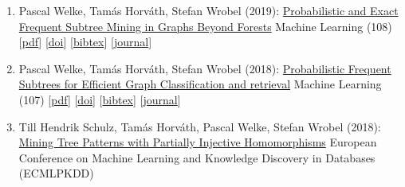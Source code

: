 \documentclass{scrartcl}
\begin{document}
\begin{enumerate}
\label{mehler2020frontiers}
Alexander Mehler, Wahed Hemati, Pascal Welke, Maxim Konca, Tolga Uslu (2020):\newline
\href{https://dx.doi.org/10.3389/feduc.2020.562670}{Multiple Texts as a Limiting Factor in Online Learning: Quantifying
(Dis-)similarities of Knowledge Networks across Languages}\newline
Frontiers in Education | Digital Education\newline
{\footnotesize
[\href{https://pwelke.github.io/publications/mehler2020frontiers.pdf}{pdf}]
[\href{https://dx.doi.org/10.3389/feduc.2020.562670}{doi}]
[\href{https://arxiv.org/abs/2008.02047}{arxiv}]
[\href{https://dblp.org/rec/journals/corr/abs-2008-02047.bib}{bibtex}]
[\href{https://www.frontiersin.org/journals/education/sections/digital-education#}{journal}]
}
\item
\label{welke2019mach}
Pascal Welke, Tamás Horváth, Stefan Wrobel (2019):\newline
\href{https://dx.doi.org/10.1007/s10994-019-05779-1}{Probabilistic and Exact Frequent Subtree Mining in Graphs Beyond Forests}\newline
Machine Learning (108)\newline
{\footnotesize
[\href{https://pwelke.github.io/publications/welke2019mach.pdf}{pdf}]
[\href{https://dx.doi.org/10.1007/s10994-019-05779-1}{doi}]
[\href{https://dblp.org/rec/journals/ml/WelkeHW19.bib}{bibtex}]
[\href{https://link.springer.com/journal/10994}{journal}]
}
\item
\label{welke2018mach}
Pascal Welke, Tamás Horváth, Stefan Wrobel (2018):\newline
\href{https://dx.doi.org/10.1007/s10994-017-5688-7}{Probabilistic Frequent Subtrees for Efficient Graph Classification
and retrieval}\newline
Machine Learning (107)\newline
{\footnotesize
[\href{https://pwelke.github.io/publications/welke2018mach.pdf}{pdf}]
[\href{https://dx.doi.org/10.1007/s10994-017-5688-7}{doi}]
[\href{https://dblp.org/rec/journals/ml/WelkeHW18.bib}{bibtex}]
[\href{https://link.springer.com/journal/10994}{journal}]
}
\item
\label{schulz2018ecml}
Till Hendrik Schulz, Tamás Horváth, Pascal Welke, Stefan Wrobel (2018):\newline
\href{https://dx.doi.org/10.1007/978-3-030-10928-8_35}{Mining Tree Patterns with Partially Injective Homomorphisms}\newline
European Conference on Machine Learning and Knowledge Discovery in Databases (ECMLPKDD)\newline

\end{enumerate}
\end{document}
